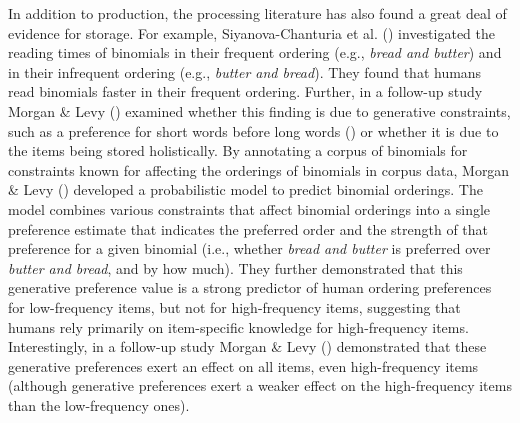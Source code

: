 \documentclass[
  12pt,
  letterpaper,
]{scrreprt}
\begin{document}
In addition to production, the processing literature has also found a
great deal of evidence for storage. For example, Siyanova-Chanturia et
al. ()
investigated the reading times of binomials in their frequent ordering
(e.g., \emph{bread and butter}) and in their infrequent ordering (e.g.,
\emph{butter and bread}). They found that humans read binomials faster
in their frequent ordering. Further, in a follow-up study Morgan \& Levy
() examined
whether this finding is due to generative constraints, such as a
preference for short words before long words
()
or whether it is due to the items being stored holistically. By
annotating a corpus of binomials for constraints known for affecting the
orderings of binomials in corpus data, Morgan \& Levy
() developed a
probabilistic model to predict binomial orderings. The model combines
various constraints that affect binomial orderings into a single
preference estimate that indicates the preferred order and the strength
of that preference for a given binomial (i.e., whether \emph{bread and
butter} is preferred over \emph{butter and bread}, and by how much).
They further demonstrated that this generative preference value is a
strong predictor of human ordering preferences for low-frequency items,
but not for high-frequency items, suggesting that humans rely primarily
on item-specific knowledge for high-frequency items. Interestingly, in a
follow-up study Morgan \& Levy ()
demonstrated that these generative preferences exert an effect on all
items, even high-frequency items (although generative preferences exert
a weaker effect on the high-frequency items than the low-frequency
ones).
\end{document}
